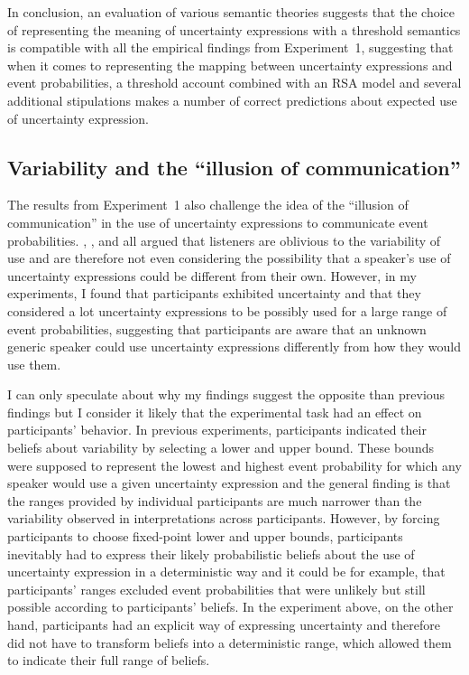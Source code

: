 \vspace{1em}

\noindent In conclusion, an evaluation of various semantic theories suggests that the choice of representing the meaning of uncertainty expressions
with a threshold semantics is compatible with all the empirical findings from Experiment~1, suggesting that when it comes to representing the mapping
between uncertainty expressions and event probabilities, a threshold account combined with an RSA model and several additional stipulations
 makes a number of correct predictions about expected use of uncertainty expression.

\subsection{Variability and the ``illusion of communication''} 

The results from Experiment~1 also challenge the idea of the ``illusion of communication'' \cite{Budescu2009} in the use of uncertainty expressions
to communicate event probabilities. \textcite{Amer1994}, \textcite{Brun1988}, and \textcite{Teigen1999} all argued that listeners are oblivious 
to the variability of use and are therefore not even considering the possibility that a speaker's use of uncertainty expressions could be different from their own.
However, in my experiments, I found that participants exhibited uncertainty and that they considered a lot uncertainty expressions to be possibly used
for a large range of event probabilities, suggesting that participants are aware that an unknown generic speaker could use uncertainty expressions
differently from how they would use them.

I can only speculate about why my findings suggest the opposite than previous findings but I consider it likely that the experimental task
had an effect on participants' behavior. In previous experiments,
participants indicated their beliefs about variability by selecting a lower and upper bound. These bounds were supposed to represent the lowest
and highest event probability for which any speaker would use a given uncertainty expression and the general finding is that the ranges provided
by individual participants are much narrower than the variability observed in interpretations across participants. However, by forcing 
participants to choose fixed-point lower and upper bounds, participants inevitably had to express their likely probabilistic beliefs about the use
of uncertainty expression in a deterministic way and it could be for example, that participants' ranges excluded event probabilities that were 
unlikely but still possible according to participants' beliefs. In the experiment above, on the other hand, participants had an explicit way of
expressing uncertainty and therefore did not have to transform beliefs into a deterministic range, which allowed them to indicate their full range
of beliefs. 

